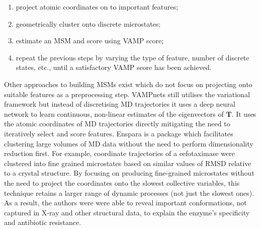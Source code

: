\begin{enumerate}
    \item project atomic coordinates on to important features;
    \item geometrically cluster onto discrete microstates;
    \item estimate an MSM and score using VAMP score;
    \item repeat the previous steps by varying the type of feature, number of discrete states, etc., until a satisfactory VAMP score has been achieved.   
\end{enumerate}

Other approaches to building MSMs exist which do not focus on  projecting onto suitable features as a preprocessing step. VAMPnets \cite{mardtVAMPnetsDeepLearning2018} still utilises the variational framework but instead of discretising MD trajectories it uses a deep neural network to learn continuous, non-linear estimates of the eigenvectors of $\mathbf{T}$. It uses the atomic coordinates of MD trajectories directly mitigating the need to iteratively select and score features.  Enspara \cite{porterEnsparaModelingMolecular2019} is a package which facilitates clustering large volumes of MD data without the need to perform dimensionality reduction first. For example, coordinate trajectories of a cefotaximase \cite{hartModellingProteinsHidden2016} were clustered into fine grained microstates based on similar values of RMSD relative to a crystal structure.  By focusing on producing fine-grained microstates without the need to project the coordinates onto the slowest collective variables, this technique retains a larger range of dynamic processes (not just the slowest ones). As a result, the authors were were able to reveal important conformations, not captured in X-ray and other structural data, to explain the enzyme's specificity and antibiotic resistance.  

